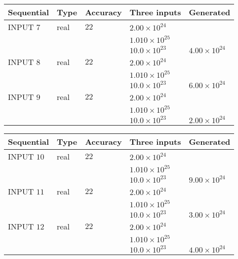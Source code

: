 \documentclass[12pt]{article}
\begin{document}
   
  
  
\noindent\begin{tabular}{|l|l|l|l|l|}
\hline
 Sequential & Type & Accuracy & Three inputs & Generated \\ 
\hline
 
 
  INPUT $           7$ & real & $          22 $ & $
 2.00 \times 10^{24}
  $ & \\
  & & &  $
 1.010 \times 10^{25}
  $ & \\
  & & &  $
 10.0 \times 10^{23}
 $ & $ 4.00 \times 10^{24} $ 
 \\  \hline  
 
 
  INPUT $           8$ & real & $          22 $ & $
 2.00 \times 10^{24}
  $ & \\
  & & &  $
 1.010 \times 10^{25}
  $ & \\
  & & &  $
 10.0 \times 10^{23}
 $ & $ 6.00 \times 10^{24} $ 
 \\  \hline  
 
 
  INPUT $           9$ & real & $          22 $ & $
 2.00 \times 10^{24}
  $ & \\
  & & &  $
 1.010 \times 10^{25}
  $ & \\
  & & &  $
 10.0 \times 10^{23}
 $ & $ 2.00 \times 10^{24} $ 
 \\  \hline  
 \end{tabular}
   
   
  
  
\noindent\begin{tabular}{|l|l|l|l|l|}
\hline
 Sequential & Type & Accuracy & Three inputs & Generated \\ 
\hline
 
 
  INPUT $          10$ & real & $          22 $ & $
 2.00 \times 10^{24}
  $ & \\
  & & &  $
 1.010 \times 10^{25}
  $ & \\
  & & &  $
 10.0 \times 10^{23}
 $ & $ 9.00 \times 10^{24} $ 
 \\  \hline  
 
 
  INPUT $          11$ & real & $          22 $ & $
 2.00 \times 10^{24}
  $ & \\
  & & &  $
 1.010 \times 10^{25}
  $ & \\
  & & &  $
 10.0 \times 10^{23}
 $ & $ 3.00 \times 10^{24} $ 
 \\  \hline  
 
 
  INPUT $          12$ & real & $          22 $ & $
 2.00 \times 10^{24}
  $ & \\
  & & &  $
 1.010 \times 10^{25}
  $ & \\
  & & &  $
 10.0 \times 10^{23}
 $ & $ 4.00 \times 10^{24} $ 
 \\  \hline  
 \end{tabular}
   
\end{document}
